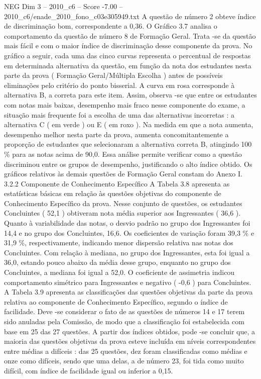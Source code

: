 \begin{textsample}{NEG Dim 3 – 2010\_c6 – Score -7.00 – 2010\_c6/enade\_2010\_fono\_c03e305949.txt}
A questão de número 2 obteve índice de discriminação bom, correspondente a 0,36.
O Gráfico 3.7 analisa o comportamento da questão de número 8 de Formação Geral.
Trata -se da questão mais fácil e com o maior índice de discriminação desse componente da prova.
No gráfico a seguir, cada uma das cinco curvas representa o percentual de respostas em determinada alternativa da questão, em função da nota dos estudantes nesta parte da prova ( Formação Geral/Múltipla Escolha ) antes de possíveis eliminações pelo critério do ponto bisserial.
A curva em rosa corresponde à alternativa B, a correta para este item.
Assim, observa -se que entre os estudantes com notas mais baixas, desempenho mais fraco nesse componente do exame, a situação mais frequente foi a escolha de uma das alternativas incorretas : a alternativa C ( em verde ) ou E ( em roxo ).
Na medida em que a nota aumenta, desempenho melhor nesta parte da prova, aumenta concomitantemente a proporção de estudantes que selecionaram a alternativa correta B, atingindo 100 \% para as notas acima de 90,0.
Essa análise permite verificar como a questão discriminou entre os grupos de desempenho, justificando o alto índice obtido.
Os gráficos relativos às demais questões de Formação Geral constam do Anexo I. 3.2.2 Componente de Conhecimento Específico A Tabela 3.8 apresenta as estatísticas básicas em relação às questões objetivas do componente de Conhecimento Específico da prova.
Nesse conjunto de questões, os estudantes Concluintes ( 52,1 ) obtiveram nota média superior aos Ingressantes ( 36,6 ).
Quanto à variabilidade das notas, o desvio padrão no grupo dos Ingressantes foi 14,4 e no grupo dos Concluintes, 16,6.
Os coeficientes de variação foram 39,3 \% e 31,9 \%, respectivamente, indicando menor dispersão relativa nas notas dos Concluintes.
Com relação à mediana, no grupo dos Ingressantes, esta foi igual a 36,0, estando pouco abaixo da média desse grupo, enquanto no grupo dos Concluintes, a mediana foi igual a 52,0.
O coeficiente de assimetria indicou comportamento simétrico para Ingressantes e negativo ( -0,6 ) para Concluintes.
A Tabela 3.9 apresenta as classificações das questões objetivas da parte da prova relativa ao componente de Conhecimento Específico, segundo o índice de facilidade.
Deve -se considerar o fato de as questões de números 14 e 17 terem sido anuladas pela Comissão, de modo que a classificação foi estabelecida com base em 25 das 27 questões.
A partir dos índices obtidos, pode -se concluir que, a maioria das questões objetivas da prova esteve incluída em níveis correspondentes entre médias a difíceis : das 25 questões, dez foram classificadas como médias e onze como difíceis, sendo que uma delas, a de número 23, foi tida como muito difícil, com índice de facilidade igual ou inferior a 0,15.

\end{textsample}
